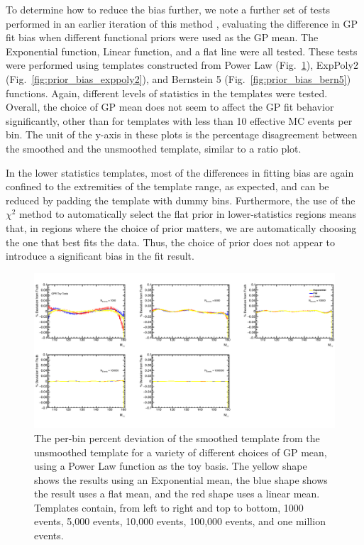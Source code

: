 To determine how to reduce the bias further, we note a further set of tests performed in an earlier iteration of this method \cite{Hyneman}, evaluating the difference in GP fit bias when different functional priors were used as the GP mean. The Exponential function, Linear function, and a flat line were all tested. These tests were performed using templates constructed from Power Law (Fig.~\ref{fig:prior_bias_powerlaw}), ExpPoly2 (Fig.~\ref{fig:prior_bias_exppoly2}), and Bernstein 5 (Fig.~\ref{fig:prior_bias_bern5}) functions. Again, different levels of statistics in the templates were tested. Overall, the choice of GP mean does not seem to affect the GP fit behavior significantly, other than for templates with less than 10 effective MC events per bin. The unit of the y-axis in these plots is the percentage disagreement between the smoothed and the unsmoothed template, similar to a ratio plot.

In the lower statistics templates, most of the differences in fitting bias are again confined to the extremities of the template range, as expected, and can be reduced by padding the template with dummy bins. Furthermore, the use of the $\chi^2$ method to automatically select the flat prior in lower-statistics regions means that, in regions where the choice of prior matters, we are automatically choosing the one that best fits the data. Thus, the choice of prior does not appear to introduce a significant bias in the fit result. 

\begin{figure} 
\begin{center}
  \includegraphics[width=\textwidth]{figures/background/gpr/checkBiasFromPriorChoice/Plots_GPR_PriorBiases_PowerLaw_crop}   
  \caption{The per-bin percent deviation of the smoothed template from the unsmoothed template for a variety of different choices of GP mean, using a Power Law function as the toy basis. The yellow shape shows the results using an Exponential mean, the blue shape shows the result uses a flat mean, and the red shape uses a linear mean. Templates contain, from left to right and top to bottom, 1000 events, 5,000 events, 10,000 events, 100,000 events, and one million events.}
\label{fig:prior_bias_powerlaw}
\end{center}
\end{figure}

